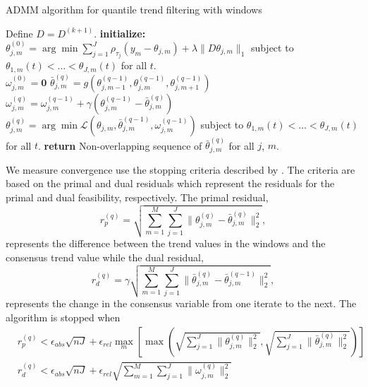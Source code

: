 \documentclass[12pt]{article}
\begin{document}
	\begin{algorithm}
		\caption{ADMM algorithm for quantile trend filtering with windows}\label{euclid}
		\begin{algorithmic}		
			\State Define $D = D^{(k+1)}$. 
			\State \textbf{initialize:} \\
				 $\theta_{j,m}^{(0)} = \arg \min \sum_{j=1}^J\rho_{\tau_j}(y_m - \theta_{j,m})+\lambda \lVert D\theta_{j,m}\rVert_1$ subject to $\theta_{1,m}(t) < \ldots<\theta_{J,m}(t)$ for all $t$. \\		
			 	 $\omega_{j,m}^{(0)} = \mathbf{0}$	
			\Repeat{}
			\State  		
			$\bar{\theta}_{j,m}^{(q)} = g(\theta_{j, m-1}^{(q-1)}, \theta_{j,m}^{(q-1)}, \theta_{j,m+1}^{(q-1)})$
			\State 
			$\omega_{j,m}^{(q)} = \omega_{j,m}^{(q-1)} + \gamma(\theta_{j,m}^{(q-1)} - \bar{\theta}_{j,m}^{(q)})$	
			\State
				$\theta_{j,m}^{(q)} = \arg\min \mathcal{L}(\theta_{j,m}, \bar{\theta}_{j,m}^{(q-1)}, \omega_{j,m}^{(q-1)})$			
			 subject to $\theta_{1,m}(t) < \ldots<\theta_{J,m}(t)$ for all $t$.
			\State \textbf{return} Non-overlapping sequence of $\bar{\theta}_{j,m}^{(q)}$ for all $j$, $m$.
			
		\end{algorithmic}
	\end{algorithm}

	We measure convergence use the stopping criteria described by \cite{boyd2011distributed}. The criteria are based on the primal and dual residuals which represent the residuals for the primal and dual feasibility, respectively. The primal residual, 
	\begin{equation}
	r_p^{(q)} = \sqrt{\sum_{m=1}^M\sum_{j=1}^J\lVert\theta_{j,m}^{(q)} - \bar{\theta}_{j,m}^{(q)}\rVert_2^2},
	\end{equation}
	represents the difference between the trend values in the windows and the consensus trend value while the dual residual,
	\begin{equation*}
	r_d^{(q)} = \gamma\sqrt{\sum_{m=1}^M \sum_{j=1}^J\lVert\bar{\theta}_{j,m}^{(q)} - \bar{\theta}_{j,m}^{(q-1)}\rVert_2^2},
	\end{equation*}
	represents the change in the consensus variable from one iterate to the next. The algorithm is stopped when 
	\begin{align}
		&r_p^{(q)} < \epsilon_{abs}\sqrt{nJ} + \epsilon_{rel}\underset{m}{\max}\left[\max 
		\left(\sqrt{\sum_{j=1}^J \lVert\theta_{j,m}^{(q)}\rVert_2^2}, \sqrt{\sum_{j=1}^J \lVert \bar{\theta}_{j,m}^{(q)} \rVert_2^2} \right )\right]\\
		&r_d^{(q)} < \epsilon_{abs}\sqrt{nJ} + \epsilon_{rel}\sqrt{\sum_{m=1}^M\sum_{j=1}^J\lVert \omega_{j,m}^{(q)}\rVert_2^2}
	\end{align}
	
\end{document}
